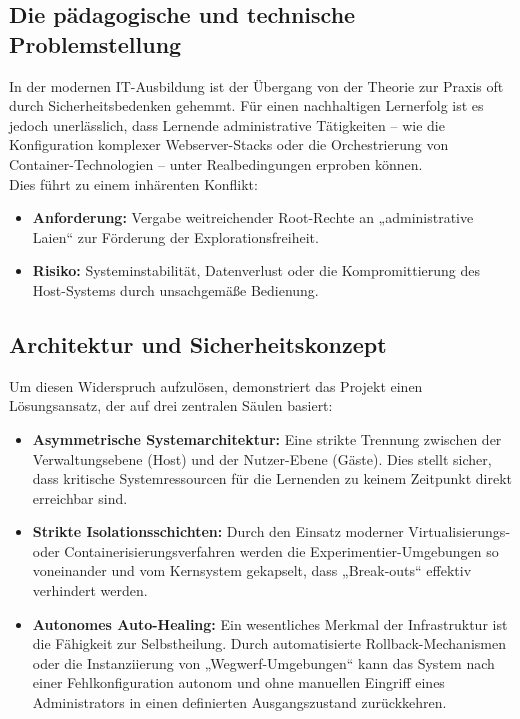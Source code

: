 \documentclass[11pt,
a4paper,
numbers=nonperiod,
footsepline,
oneside,
numbers=noenddot,
bibliography=totoc
]{scrartcl}
\begin{document}
\subsection{Die pädagogische und technische Problemstellung}
In der modernen IT-Ausbildung ist der Übergang von der Theorie zur Praxis oft durch Sicherheitsbedenken gehemmt. Für einen nachhaltigen Lernerfolg ist es jedoch unerlässlich, dass Lernende administrative Tätigkeiten – wie die Konfiguration komplexer Webserver-Stacks oder die Orchestrierung von Container-Technologien – unter Realbedingungen erproben können.\\

Dies führt zu einem inhärenten Konflikt:
\begin{itemize}
	\item \textbf{Anforderung:} Vergabe weitreichender Root-Rechte an „administrative Laien“ zur Förderung der Explorationsfreiheit.
    \item \textbf{Risiko:} Systeminstabilität, Datenverlust oder die Kompromittierung des Host-Systems durch unsachgemäße Bedienung.
\end{itemize}

\subsection{Architektur und Sicherheitskonzept}
Um diesen Widerspruch aufzulösen, demonstriert das Projekt einen Lösungsansatz, der auf drei zentralen Säulen basiert:
\begin{itemize}
\item \textbf{Asymmetrische Systemarchitektur:} Eine strikte Trennung zwischen der Verwaltungsebene (Host) und der Nutzer-Ebene (Gäste). Dies stellt sicher, dass kritische Systemressourcen für die Lernenden zu keinem Zeitpunkt direkt erreichbar sind.

\item \textbf{Strikte Isolationsschichten:} Durch den Einsatz moderner Virtualisierungs- oder Containerisierungsverfahren werden die Experimentier-Umgebungen so voneinander und vom Kernsystem gekapselt, dass „Break-outs“ effektiv verhindert werden.

\item \textbf{Autonomes Auto-Healing:} Ein wesentliches Merkmal der Infrastruktur ist die Fähigkeit zur Selbstheilung. Durch automatisierte Rollback-Mechanismen oder die Instanziierung von „Wegwerf-Umgebungen“ kann das System nach einer Fehlkonfiguration autonom und ohne manuellen Eingriff eines Administrators in einen definierten Ausgangszustand zurückkehren.
\end{itemize}
\end{document}
